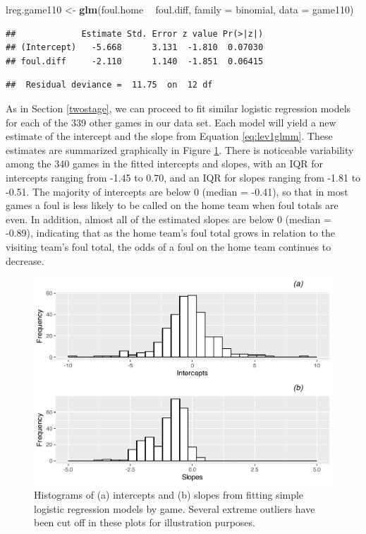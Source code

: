 \documentclass[
]{krantz}
\newenvironment{Shaded}{\begin{snugshade}}{\end{snugshade}}
\newcommand{\DataTypeTok}[1]{\textcolor[rgb]{0.27,0.27,0.27}{#1}}
\newcommand{\KeywordTok}[1]{\textcolor[rgb]{0.27,0.27,0.27}{\textbf{#1}}}
\newcommand{\NormalTok}[1]{#1}
\newcommand{\OperatorTok}[1]{\textcolor[rgb]{0.43,0.43,0.43}{\textbf{#1}}}
\newcommand{\StringTok}[1]{\textcolor[rgb]{0.5,0.5,0.5}{#1}}
\begin{document}
\begin{Shaded}
\begin{Highlighting}[]
\NormalTok{lreg.game110 <-}\StringTok{ }\KeywordTok{glm}\NormalTok{(foul.home }\OperatorTok{~}\StringTok{ }\NormalTok{foul.diff, }
                    \DataTypeTok{family =}\NormalTok{ binomial, }\DataTypeTok{data =}\NormalTok{ game110)}
\end{Highlighting}
\end{Shaded}

\begin{verbatim}
##             Estimate Std. Error z value Pr(>|z|)
## (Intercept)   -5.668      3.131  -1.810  0.07030
## foul.diff     -2.110      1.140  -1.851  0.06415
\end{verbatim}

\begin{verbatim}
##  Residual deviance =  11.75  on  12 df
\end{verbatim}

As in Section \ref{twostage}, we can proceed to fit similar logistic regression models for each of the 339 other games in our data set. Each model will yield a new estimate of the intercept and the slope from Equation \eqref{eq:lev1glmm}. These estimates are summarized graphically in Figure \ref{fig:gmu-histmat2}. There is noticeable variability among the 340 games in the fitted intercepts and slopes, with an IQR for intercepts ranging from -1.45 to 0.70, and an IQR for slopes ranging from -1.81 to -0.51. The majority of intercepts are below 0 (median = -0.41), so that in most games a foul is less likely to be called on the home team when foul totals are even. In addition, almost all of the estimated slopes are below 0 (median = -0.89), indicating that as the home team's foul total grows in relation to the visiting team's foul total, the odds of a foul on the home team continues to decrease.

\begin{figure}

{\centering \includegraphics[width=0.6\linewidth]{bookdown-BeyondMLR_files/figure-latex/gmu-histmat2-1} 

}

\caption{Histograms of (a) intercepts and (b) slopes from fitting simple logistic regression models by game.  Several extreme outliers have been cut off in these plots for illustration purposes.}\label{fig:gmu-histmat2}
\end{figure}
\end{document}
